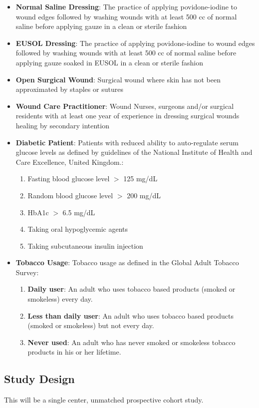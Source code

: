 \documentclass{article}
\begin{document}
\begin{itemize}
\item \textbf{Normal Saline Dressing}: The practice of applying povidone-iodine to wound
edges followed by washing wounds with at least 500 cc of normal saline before
applying gauze in a clean or sterile fashion
\item \textbf{EUSOL Dressing}: The practice of applying povidone-iodine to wound edges
followed by washing wounds with at least 500 cc of normal saline before
applying gauze soaked in EUSOL in a clean or sterile fashion
\item \textbf{Open Surgical Wound}: Surgical wound where skin has not been approximated by
staples or sutures
\item \textbf{Wound Care Practitioner}: Wound Nurses, surgeons and/or surgical residents
with at least one year of experience in dressing surgical wounds healing by
secondary intention
\item \textbf{Diabetic Patient}: Patients with reduced ability to auto-regulate serum
glucose levels as defined by guidelines of the National Institute of Health
and Care Excellence, United Kingdom.\cite{ICGT_2015}:
\begin{enumerate}
\item Fasting blood glucose level $>$ 125 mg/dL
\item Random blood glucose level $>$ 200 mg/dL
\item HbA1c $>$ 6.5 mg/dL
\item Taking oral hypoglycemic agents
\item Taking subcutaneous insulin injection
\end{enumerate}
\item \textbf{Tobacco Usage}: Tobacco usage as defined in the Global Adult Tobacco Survey:\cite{GATS_2010}
\begin{enumerate}
\item \textbf{Daily user}: An adult who uses tobacco based products (smoked or
smokeless) every day.
\item \textbf{Less than daily user}: An adult who uses tobacco based products (smoked or
smokeless) but not every day.
\item \textbf{Never used}: An adult who has never smoked or smokeless tobacco products
in his or her lifetime.
\end{enumerate}
\end{itemize}


\subsection{Study Design}
This will be a single center, unmatched prospective cohort study.
\end{document}
